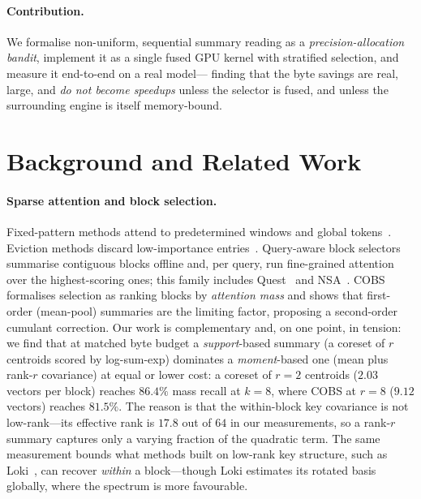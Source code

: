 \documentclass[sigconf,nonacm,11pt]{acmart}
\begin{document}
\paragraph{Contribution.} We formalise non-uniform, sequential summary reading
as a \emph{precision-allocation bandit}, implement it as a single fused GPU
kernel with stratified selection, and measure it end-to-end on a real model---%
finding that the byte savings are real, large, and \emph{do not become
speedups} unless the selector is fused, and unless the surrounding engine is
itself memory-bound.

\section{Background and Related Work}

\paragraph{Sparse attention and block selection.} Fixed-pattern methods attend
to predetermined windows and global tokens~\cite{beltagy2020longformer,%
zaheer2020bigbird}. Eviction methods discard low-importance
entries~\cite{xiao2024streamingllm,zhang2023h2o,li2024snapkv}. Query-aware block
selectors summarise contiguous blocks offline and, per query, run fine-grained
attention over the highest-scoring ones; this family includes
Quest~\cite{tang2024quest} and NSA~\cite{yuan2025nsa}. COBS~\cite{tian2026cobs}
formalises selection as ranking blocks by \emph{attention mass} and shows that
first-order (mean-pool) summaries are the limiting factor, proposing a
second-order cumulant correction. Our work is complementary and, on one point,
in tension: we find that at matched byte budget a \emph{support}-based summary
(a coreset of $r$ centroids scored by log-sum-exp) dominates a \emph{moment}-based
one (mean plus rank-$r$ covariance) at equal or lower cost: a coreset of $r=2$
centroids ($2.03$ vectors per block) reaches $86.4\%$ mass recall at $k=8$, where
COBS at $r=8$ ($9.12$ vectors) reaches $81.5\%$. The reason is that the
within-block key covariance is not low-rank---its effective rank is $17.8$ out of $64$ in our measurements, so
a rank-$r$ summary captures only a varying fraction of the quadratic term. The
same measurement bounds what methods built on low-rank key structure, such as
Loki~\cite{singhania2024loki}, can recover \emph{within} a block---though Loki
estimates its rotated basis globally, where the spectrum is more favourable.
\end{document}
